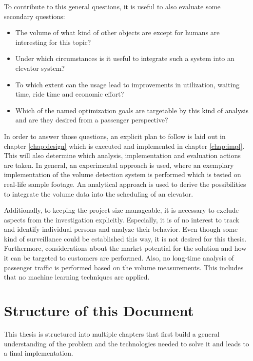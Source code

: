 To contribute to this general questions, it is useful to also evaluate some secondary questions:

\begin{itemize}
    \item The volume of what kind of other objects are except for humans are interesting for this topic?
    \item Under which circumstances is it useful to integrate such a system into an elevator system?
    \item To which extent can the usage lead to improvements in utilization, waiting time, ride time and economic effort?
    \item Which of the named optimization goals are targetable by this kind of analysis and are they desired from a passenger perspective?
\end{itemize}

In order to answer those questions, an explicit plan to follow is laid out in chapter \ref{chap:design} which is executed and implemented in chapter \ref{chap:impl}. 
This will also determine which analysis, implementation and evaluation actions are taken. 
In general, an experimental approach is used, where an exemplary implementation of the volume detection system is performed which is tested on real-life sample footage. 
An analytical approach is used to derive the possibilities to integrate the volume data into the scheduling of an elevator.

Additionally, to keeping the project size manageable, it is necessary to exclude aspects from the  investigation explicitly. 
Especially, it is of no interest to track and identify individual persons and analyze their behavior. 
Even though some kind of surveillance could be established this way, it is not desired for this thesis.
Furthermore, considerations about the market potential for the solution and how it can be targeted to customers are performed. 
Also, no long-time analysis of passenger traffic is performed based on the volume measurements.
This includes that no machine learning techniques are applied.

\section{Structure of this Document}

This thesis is structured into multiple chapters that first build a general understanding of the problem and the technologies needed to solve it and leads to a final implementation.

